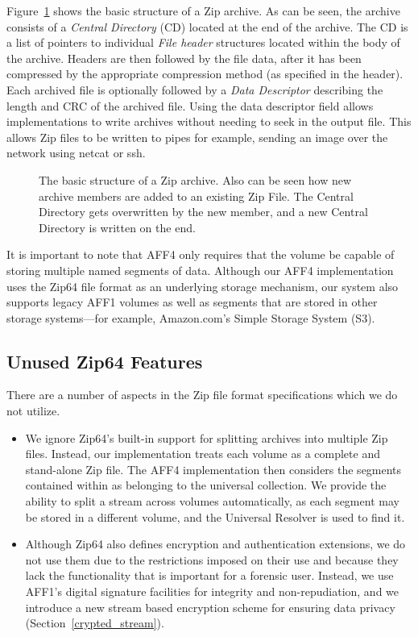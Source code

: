 \documentclass[10pt, conference]{IEEEtran}
\begin{document}
Figure~\ref{zip_structure} shows the basic structure of a Zip
archive. As can be seen, the archive consists of a {\em Central Directory} (CD)
located at the end of the archive. The CD is a list of pointers to
individual {\em File header} structures located within the body of the
archive. Headers are then followed by the file data, after it has been
compressed by the appropriate compression method (as specified in the
header). Each archived file is optionally followed by a {\em Data
Descriptor} describing the length and CRC of the archived file. Using
the data descriptor field allows implementations to write archives
without needing to seek in the output file. This allows Zip files to
be written to pipes for example, sending an image over the network
using netcat or ssh.

\begin{figure}[tbp]
  \begin{center}
  \mbox{\columnwidth {}}
  \caption{The basic structure of a Zip archive. Also can be seen how
new archive members are added to an existing Zip File. The
Central Directory gets overwritten by the new member, and a new
Central Directory is written on the end.  }
  \label{zip_structure}
  \end{center}
\end{figure}

It is important to note that AFF4 only requires that the volume be
capable of storing multiple named segments of data. Although our AFF4
implementation uses the Zip64 file format as an underlying storage
mechanism, our system also supports legacy AFF1 volumes as well as
segments that are stored in other storage systems---for example,
Amazon.com's Simple Storage System (S3)\cite{s3-aws-home-page-money}.

\subsection{Unused Zip64 Features}
There are a number of aspects in the Zip file format specifications
which we do not utilize.
\begin{itemize}
\item We ignore Zip64's built-in support for splitting
archives into multiple Zip files. Instead, our implementation treats
each volume as a complete and stand-alone Zip file. The AFF4
implementation then considers the segments contained within as
belonging to the universal collection. We provide the ability to split
a stream across volumes automatically, as each segment may be stored
in a different volume, and the Universal Resolver is used to find it.

\item Although Zip64 also defines encryption and authentication
extensions, we do not use them due to the restrictions imposed on
their use and because they lack the functionality that is important
for a forensic user. Instead, we use AFF1's digital signature
facilities for integrity and non-repudiation, and we introduce a new
stream based encryption scheme for ensuring data privacy
(Section~\ref{crypted_stream}).

\end{itemize}
\end{document}
